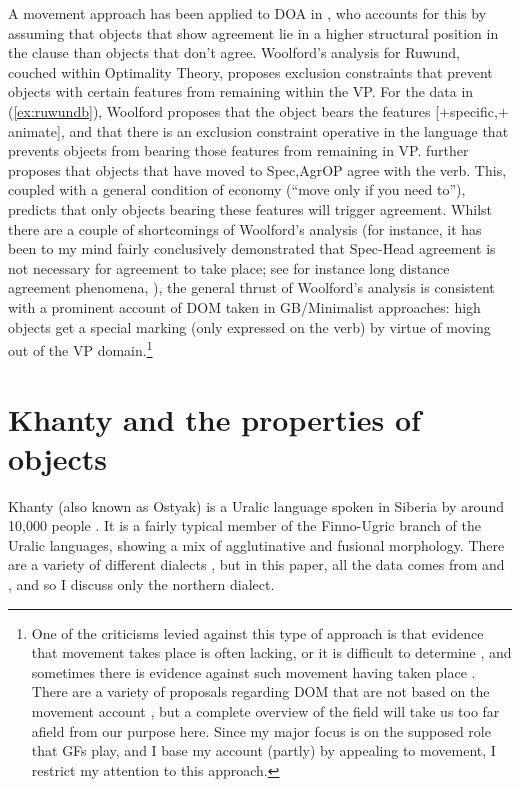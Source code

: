 \documentclass[output=paper
,modfonts
,nonflat]{langsci/langscibook}
\begin{document}
A movement approach has been applied to DOA in \citet{woolford1999,woolford2001}, who accounts for this by assuming that objects that show agreement lie in a higher structural position in the clause than objects that don't agree.
Woolford's analysis for Ruwund, couched within Optimality Theory, proposes exclusion constraints that prevent objects with certain features from remaining within the VP.
For the data in (\ref{ex:ruwundb}), Woolford proposes that the object bears the features [$+$specific,$+$animate], and that there is an exclusion constraint operative in the language that prevents objects from bearing those features from remaining in VP.
 \citeauthor{woolford2001} further proposes that objects that have moved to Spec,AgrOP agree with the verb. 
This, coupled with a general condition of economy (``move only if you need to''), predicts that only objects bearing these features will trigger agreement. 
Whilst there are a couple of shortcomings of Woolford's analysis (for instance, it has been to my mind fairly conclusively demonstrated that Spec-Head agreement is not necessary for agreement to take place; see for instance long distance agreement phenomena, \citealt{polinskypotsdam2001}), the general thrust of Woolford's analysis is consistent with a prominent account of DOM taken in GB/Minimalist approaches: high objects get a special marking (only expressed on the verb) by virtue of moving out of the VP domain.\footnote{One of the criticisms levied against this type of approach is that evidence that movement takes place is often lacking, or it is difficult to determine \citep{dn2011,Baker2015}, and sometimes there is evidence against such movement having taken place \citep{kalinweisser2017}. 
There are a variety of proposals regarding DOM that are not based on the movement account \citep{bossong1991,aissen2003,deswart2007,keinemuller2014,kalin2017}, but a complete overview of the field will take us too far afield from our purpose here. Since my major focus is on the supposed role that GFs play, and I base my account (partly) by appealing to movement, I restrict my attention to this approach.}

\section{Khanty and the properties of objects}\label{Khanty}
Khanty (also known as Ostyak) is a Uralic language spoken in Siberia by around 10,000 people \citep{ethnologue}.
It is a fairly typical member of the Finno-Ugric branch of the Uralic languages, showing a mix of agglutinative and fusional morphology.
There are a variety of different dialects \citep{ostyakgrammar}, but in this paper, all the data comes from \citet{nikolaeva1999,nikolaeva2001} and \citet{dn2011}, and so I discuss only the northern dialect.
\end{document}
